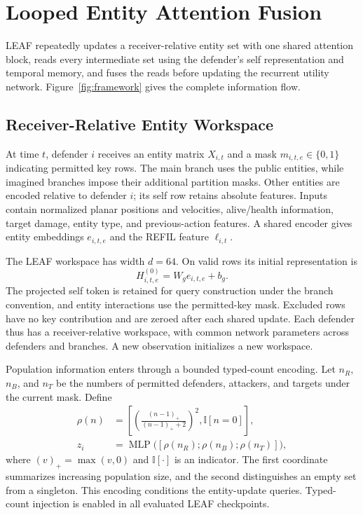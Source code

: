 \section{Looped Entity Attention Fusion}
\label{sec:method}
LEAF repeatedly updates a receiver-relative entity set with one shared attention block, reads every intermediate set using the defender's self representation and temporal memory, and fuses the reads before updating the recurrent utility network. Figure~\ref{fig:framework} gives the complete information flow.

\subsection{Receiver-Relative Entity Workspace}
At time $t$, defender $i$ receives an entity matrix $X_{i,t}$ and a mask $m_{i,t,e}\in\{0,1\}$ indicating permitted key rows. The main branch uses the public entities, while imagined branches impose their additional partition masks. Other entities are encoded relative to defender $i$; its self row retains absolute features. Inputs contain normalized planar positions and velocities, alive/health information, target damage, entity type, and previous-action features. A shared encoder gives entity embeddings $e_{i,t,e}$ and the REFIL feature $\ell_{i,t}$.

The LEAF workspace has width $d=64$. On valid rows its initial representation is
\begin{equation}
 H^{(0)}_{i,t,e}=W_g e_{i,t,e}+b_g.
 \label{eq:workspace}
\end{equation}
The projected self token is retained for query construction under the branch convention, and entity interactions use the permitted-key mask. Excluded rows have no key contribution and are zeroed after each shared update. Each defender thus has a receiver-relative workspace, with common network parameters across defenders and branches. A new observation initializes a new workspace.

Population information enters through a bounded typed-count encoding. Let $n_R$, $n_B$, and $n_T$ be the numbers of permitted defenders, attackers, and targets under the current mask. Define
\begin{align}
 \rho(n)&=\left[\left(\frac{(n-1)_+}{(n-1)_++2}\right)^2,
                   \mathbb I[n=0]\right],\nonumber\\
 z_i&=\operatorname{MLP}\bigl([\rho(n_R);\rho(n_B);\rho(n_T)]\bigr),
 \label{eq:counts}
\end{align}
where $(v)_+=\max(v,0)$ and $\mathbb I[\cdot]$ is an indicator. The first coordinate summarizes increasing population size, and the second distinguishes an empty set from a singleton. This encoding conditions the entity-update queries. Typed-count injection is enabled in all evaluated LEAF checkpoints.

